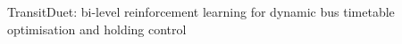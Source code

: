 \documentclass[10pt]{article}
\begin{document}
\vspace*{0.35\textheight}
\begin{center}
{\LARGE TransitDuet: bi-level reinforcement learning for dynamic bus timetable optimisation and holding control}
\end{center}
\end{document}
